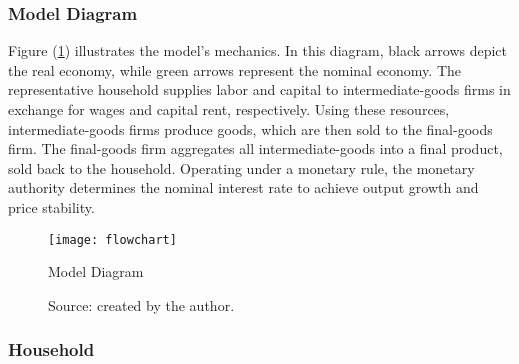 \documentclass[../thesis.tex]{subfiles}
\begin{document}


\subsubsection*{Model Diagram}


Figure (\ref{fig_v6:model-diagram}) illustrates the model's mechanics. In this diagram, black arrows depict the real economy, while green arrows represent the nominal economy. The representative household supplies labor and capital to intermediate-goods firms in exchange for wages and capital rent, respectively. Using these resources, intermediate-goods firms produce goods, which are then sold to the final-goods firm. The final-goods firm aggregates all intermediate-goods into a final product, sold back to the household. Operating under a monetary rule, the monetary authority determines the nominal interest rate to achieve output growth and price stability.

\begin{figure}[p!]
	\centering
	\texttt{[image: flowchart]}
	\caption{Model Diagram}
	\caption*{Source: created by the author.}
	\label{fig_v6:model-diagram}
\end{figure}	
	


\newpage

\subsubsection{Household}
\end{document}
